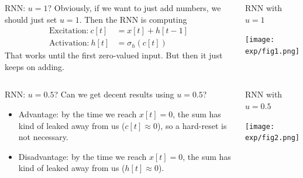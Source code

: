 \documentclass{beamer}
\begin{document}
\begin{frame}
  \begin{columns}
    \column{2.25in}
    \begin{block}{RNN: $u=1$?}
      Obviously, if we want to just add numbers, we should just set
      $u=1$.  Then the RNN is computing
      \begin{align*}
        \mbox{Excitation:}~c[t] &= x[t]+h[t-1]\\
        \mbox{Activation:}~h[t] &= \sigma_h\left(c[t]\right)
      \end{align*}
      That works until the first zero-valued input.  But then it just
      keeps on adding.
    \end{block}
    \column{2.25in}
    \begin{block}{RNN with $u=1$}
      \centerline{\texttt{[image: exp/fig1.png]}}
    \end{block}
    \end{columns}
\end{frame}

\begin{frame}
  \begin{columns}
    \column{2.25in}
    \begin{block}{RNN: $u=0.5$?}
      Can we get decent results using $u=0.5$? 
      \begin{itemize}
        \item Advantage: by the time we reach $x[t]=0$, the sum has
          kind of leaked away from us ($c[t]\approx 0$), so a
          hard-reset is not necessary.
        \item Disadvantage: by the time we reach $x[t]=0$, the sum has
          kind of leaked away from us ($h[t]\approx 0$).
      \end{itemize}
    \end{block}
    \column{2.25in}
    \begin{block}{RNN with $u=0.5$}
      \centerline{\texttt{[image: exp/fig2.png]}}
    \end{block}
    \end{columns}
\end{frame}
\end{document}
